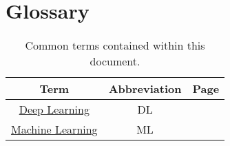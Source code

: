 \vspace{-3em}
\section*{\centering Glossary}
\vspace{-2em}
\begin{table}[ht]
    \centering \footnotesize
    \begin{tabular}{||c | c | c||} 
        \hline
        Term & Abbreviation & Page\\ [0.5ex] 
        \hline\hline
        \hyperref[sec:deep learning]{Deep Learning} & DL & \pageref{sec:deep learning}\\ 
        \hline
        \hyperref[sec:machine learning]{Machine Learning} & ML & \pageref{sec:machine learning}\\ 
        \hline
    \end{tabular}
    \caption[Glossary]{Common terms contained within this document.}
    \label{table:glossary}
\end{table}